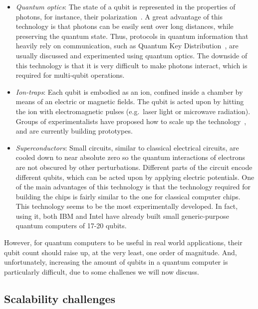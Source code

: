 \begin{itemize}

\item \textit{Quantum optics}: The state of a qubit is represented in the properties of photons, for instance, their polarization~\citep{OpticsQC}. A great advantage of this technology is that photons can be easily sent over long distances, while preserving the quantum state. Thus, protocols in quantum information that heavily rely on communication, such as Quantum Key Distribution~\citep{QKD}, are usually discussed and experimented using quantum optics. The downside of this technology is that it is very difficult to make photons interact, which is required for multi-qubit operations.

\item \textit{Ion-traps}: Each qubit is embodied as an ion, confined inside a chamber by means of an electric or magnetic fields. The qubit is acted upon by hitting the ion with electromagnetic pulses (e.g.\ laser light or microwave radiation). Groups of experimentalists have proposed how to scale up the technology~\citep{HensingerIonTraps}, and are currently building prototypes.

\item \textit{Superconductors}: Small circuits, similar to classical electrical circuits, are cooled down to near absolute zero so the quantum interactions of electrons are not obscured by other perturbations. Different parts of the circuit encode different qubits, which can be acted upon by applying electric potentials. One of the main advantages of this technology is that the technology required for building the chips is fairly similar to the one for classical computer chips. This technology seems to be the most experimentally developed. In fact, using it, both IBM and Intel have already built small generic-purpose quantum computers of 17-20 qubits.

\end{itemize}

However, for quantum computers to be useful in real world applications, their qubit count should raise up, at the very least, one order of magnitude. And, unfortunately, increasing the amount of qubits in a quantum computer is particularly difficult, due to some challenes we will now discuss.


\subsection{Scalability challenges}
\label{Challenges}

